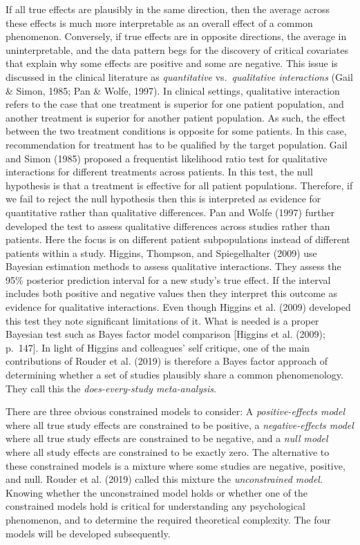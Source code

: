 \documentclass[english,,man]{apa6}
\begin{document}
If all true effects are plausibly in the same direction, then the average across these effects is much more interpretable as an overall effect of a common phenomenon. Conversely, if true effects are in opposite directions, the average in uninterpretable, and the data pattern begs for the discovery of critical covariates that explain why some effects are positive and some are negative. This issue is discussed in the clinical literature as \emph{quantitative} vs.~\emph{qualitative interactions} (Gail \& Simon, 1985; Pan \& Wolfe, 1997). In clinical settings, qualitative interaction refers to the case that one treatment is superior for one patient population, and another treatment is superior for another patient population. As such, the effect between the two treatment conditions is opposite for some patients. In this case, recommendation for treatment has to be qualified by the target population. Gail and Simon (1985) proposed a frequentist likelihood ratio test for qualitative interactions for different treatments across patients. In this test, the null hypothesis is that a treatment is effective for all patient populations. Therefore, if we fail to reject the null hypothesis then this is interpreted as evidence for quantitative rather than qualitative differences. Pan and Wolfe (1997) further developed the test to assess qualitative differences across studies rather than patients. Here the focus is on different patient subpopulations instead of different patients within a study. Higgins, Thompson, and Spiegelhalter (2009) use Bayesian estimation methods to assess qualitative interactions. They assess the 95\% posterior prediction interval for a new study's true effect. If the interval includes both positive and negative values then they interpret this outcome as evidence for qualitative interactions. Even though Higgins et al. (2009) developed this test they note significant limitations of it. What is needed is a proper Bayesian test such as Bayes factor model comparison {[}Higgins et al. (2009); p.~147{]}. In light of Higgins and colleagues' self critique, one of the main contributions of Rouder et al. (2019) is therefore a Bayes factor approach of determining whether a set of studies plausibly share a common phenomenology. They call this the \emph{does-every-study meta-analysis}.

There are three obvious constrained models to consider: A \emph{positive-effects model} where all true study effects are constrained to be positive, a \emph{negative-effects model} where all true study effects are constrained to be negative, and a \emph{null model} where all study effects are constrained to be exactly zero. The alternative to these constrained models is a mixture where some studies are negative, positive, and null. Rouder et al. (2019) called this mixture the \emph{unconstrained model}. Knowing whether the unconstrained model holds or whether one of the constrained models hold is critical for understanding any psychological phenomenon, and to determine the required theoretical complexity. The four models will be developed subsequently.
\end{document}

